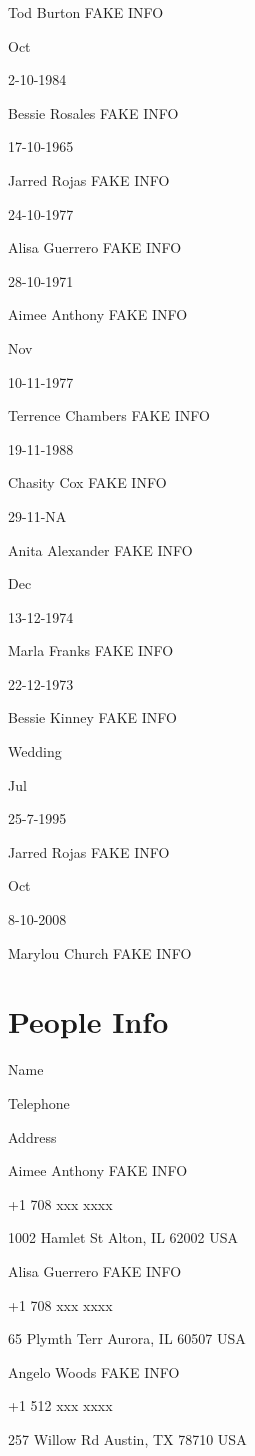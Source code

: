 \documentclass[]{book}
\theoremstyle{definition}
\theoremstyle{definition}
\theoremstyle{definition}
\theoremstyle{remark}
\begin{document}
Tod Burton FAKE INFO

Oct

2-10-1984

Bessie Rosales FAKE INFO

17-10-1965

Jarred Rojas FAKE INFO

24-10-1977

Alisa Guerrero FAKE INFO

28-10-1971

Aimee Anthony FAKE INFO

Nov

10-11-1977

Terrence Chambers FAKE INFO

19-11-1988

Chasity Cox FAKE INFO

29-11-NA

Anita Alexander FAKE INFO

Dec

13-12-1974

Marla Franks FAKE INFO

22-12-1973

Bessie Kinney FAKE INFO

Wedding

Jul

25-7-1995

Jarred Rojas FAKE INFO

Oct

8-10-2008

Marylou Church FAKE INFO

\section{People Info}\label{people-info}

Name

Telephone

Address

Aimee Anthony FAKE INFO

+1 708 xxx xxxx

1002 Hamlet St Alton, IL 62002 USA

Alisa Guerrero FAKE INFO

+1 708 xxx xxxx

65 Plymth Terr Aurora, IL 60507 USA

Angelo Woods FAKE INFO

+1 512 xxx xxxx

257 Willow Rd Austin, TX 78710 USA
\end{document}
